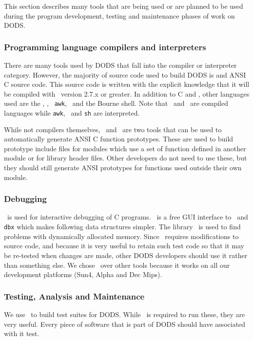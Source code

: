 This section describes many tools that are being used or are planned to be
used during the program development, testing and maintenance phases of work
on DODS.

\subsubsection{Programming language compilers and interpreters}

There are many tools used by DODS that fall into the compiler or interpreter
category. However, the majority of source code used to build DODS is \Cpp
and ANSI C source code. This source code is written with the explicit
knowledge that it will be compiled with \gcc\ version 2.7.x or greater. In
addition to C and \Cpp, other languages used are the \flex, \bison, {\tt
awk}, \perl\ and the Bourne shell. Note that \flex\ and \bison\ are compiled
languages while {\tt awk}, \perl\ and {\tt sh} are interpreted.

While not compilers themselves, \cproto\ and \cextract\ are two tools that
can be used to automatically generate ANSI C function prototypes. These are
used to build prototype include files for modules which use a set of function
defined in another module or for library header files. Other developers do
not need to use these, but they should still generate ANSI prototypes for
functions used outside their own module.

\subsubsection{Debugging}

\gdb\ is used for interactive debugging of C programs. \guidebugger\ is a
free GUI interface to \gdb\ and {\tt dbx} which makes following data
structures simpler. The library \dmalloc\ is used to find problems with
dynamically allocated memory. Since \dmalloc\ requires modifications to
source code, and because it is very useful to retain such test code so that
it may be re-tested when changes are made, other DODS developers should use it
rather than something else. We chose \dmalloc\ over other tools because it
works on all our development platforms (Sun4, Alpha and Dec Mips).

\subsubsection{Testing, Analysis and Maintenance}

We use \dejagnu\ to build test suites for DODS\@. While \dejagnu\ is required
to run these, they are very useful. Every piece of software that is part of
DODS should have associated with it test. 


